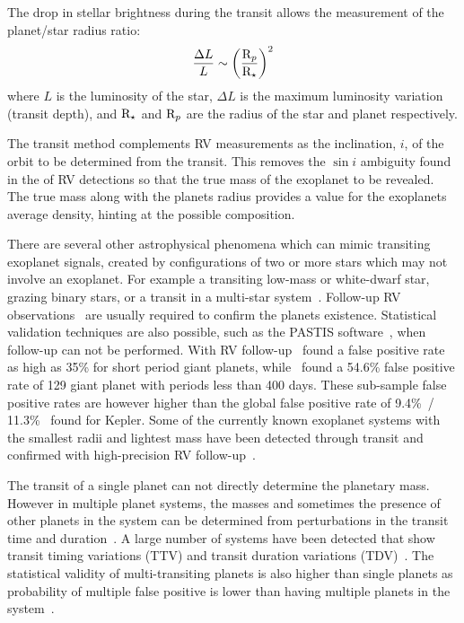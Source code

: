 The drop in stellar brightness during the transit allows the measurement of the planet/star radius ratio:
\begin{equation}
    \frac{\Delta L}{L} \sim {\left(\frac{\textrm{R}_{p}}{\textrm{R}_{\star}}\right)}^{2}
\end{equation}
where \(L\) is the luminosity of the star, \(\Delta L\) is the maximum luminosity variation (transit depth), and \(\textrm{R}_{\star}\) and \(\textrm{R}_{p}\) are the radius of the star and planet respectively.

The transit method complements {RV} measurements as the inclination, $i$, of the orbit to be determined from the transit.
This removes the {$\sin{i}$} ambiguity found in the \msini{} of {RV} detections so that the true mass of the exoplanet to be revealed.
The true mass along with the planets radius provides a value for the exoplanets average density, hinting at the possible composition.

There are several other astrophysical phenomena which can mimic transiting exoplanet signals, created by configurations of two or more stars which may not involve an exoplanet. 
For example a transiting low-mass or white-dwarf star, grazing binary stars, or a transit in a multi-star system~\citep[e.g.][]{cameron_extrasolar_2012, santerne_contribution_2013}.
Follow-up {RV} observations~\citep[e.g.][]{santerne_radial_2011} are usually required to confirm the planets existence. 
Statistical validation techniques are also possible, such as the PASTIS software~\cite{diaz_pastis_2014}, when follow-up can not be performed.
With {RV} follow-up~\citet{santerne_sophie_2012} found a false positive rate as high as 35\% for short period giant planets, while~\citet{santerne_sophie_2016} found a 54.6\% false positive rate of 129 giant planet with periods less than 400 days.
These sub-sample false positive rates are however higher than the global false positive rate of 9.4\%~\citep{Fressin_false_2013}/ 11.3\%~\citep{santerne_contribution_2013} found for Kepler.
Some of the currently known exoplanet systems with the smallest radii and lightest mass have been detected through transit and confirmed with high-precision {RV} follow-up~\citep[e.g.][]{queloz_corot7_2009, pepe_earthsized_2013, lopez-morales_kepler21b_2016, ment_second_2018}.

The transit of a single planet can not directly determine the planetary mass.
However in multiple planet systems, the masses and sometimes the presence of other planets in the system can be determined from perturbations in the transit time and duration~\citep[e.g.][]{holman_use_2005, holman_kepler9_2010}.
A large number of systems have been detected that show transit timing variations (TTV) and transit duration variations (TDV)~\citep[e.g.][]{holczer_transit_2016}.
The statistical validity of multi-transiting planets is also higher than single planets as probability of multiple false positive is lower than having multiple planets in the system~\citep{lissauer_almost_2012}.

